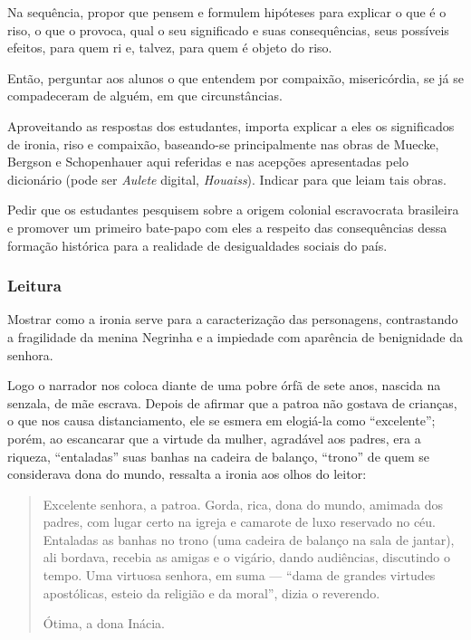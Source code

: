 \documentclass[11pt]{extarticle}
\begin{document}
Na sequência, propor que pensem e formulem hipóteses para explicar o que
é o riso, o que o provoca, qual o seu significado e suas consequências,
seus possíveis efeitos, para quem ri e, talvez, para quem é objeto do
riso.

Então, perguntar aos alunos o que entendem por compaixão, misericórdia,
se já se compadeceram de alguém, em que circunstâncias.

Aproveitando as respostas dos estudantes, importa explicar a eles os
significados de ironia, riso e compaixão, baseando-se principalmente nas
obras de Muecke, Bergson e Schopenhauer aqui referidas e nas acepções
apresentadas pelo dicionário (pode ser \emph{Aulete} digital,
\emph{Houaiss}). Indicar para que leiam tais obras.

Pedir que os estudantes pesquisem sobre a origem colonial escravocrata
brasileira e promover um primeiro bate-papo com eles a respeito das
consequências dessa formação histórica para a realidade de desigualdades
sociais do país.

\subsubsection{Leitura}

Mostrar como a ironia serve para a caracterização das personagens,
contrastando a fragilidade da menina Negrinha e a impiedade com
aparência de benignidade da senhora.

Logo o narrador nos coloca diante de uma pobre órfã de sete anos,
nascida na senzala, de mãe escrava. Depois de afirmar que a patroa não
gostava de crianças, o que nos causa distanciamento, ele se esmera em
elogiá-la como ``excelente''; porém, ao escancarar que a virtude da
mulher, agradável aos padres, era a riqueza, ``entaladas'' suas banhas
na cadeira de balanço, ``trono'' de quem se considerava dona do mundo,
ressalta a ironia aos olhos do leitor:

\begin{quote}
Excelente senhora, a patroa. Gorda, rica, dona do mundo, amimada dos
padres, com lugar certo na igreja e camarote de luxo reservado no céu.
Entaladas as banhas no trono (uma cadeira de balanço na sala de jantar),
ali bordava, recebia as amigas e o vigário, dando audiências, discutindo
o tempo. Uma virtuosa senhora, em suma --- ``dama de grandes virtudes
apostólicas, esteio da religião e da moral'', dizia o reverendo.

Ótima, a dona Inácia.
\end{quote}
\end{document}
